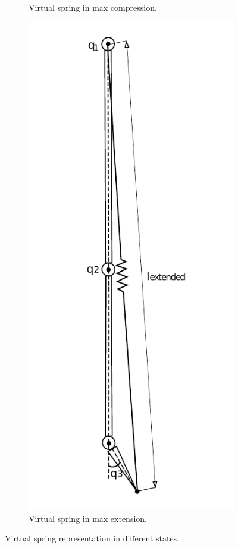 \begin{figure}[ht!]
\begin{subfigure}[b]{0.25\textwidth}
        \caption{Virtual spring in max compression.}
        \label{fig:virtual_spring2}
    \end{subfigure}
    \begin{subfigure}[b]{0.25\textwidth}
        \includegraphics[width=\textwidth]{figures//spring_model_max_extended.pdf}
        \caption{Virtual spring in max extension.}
        \label{fig:virtual_spring3}
    \end{subfigure}
    \caption{Virtual spring representation in different states.}
\end{figure}  

